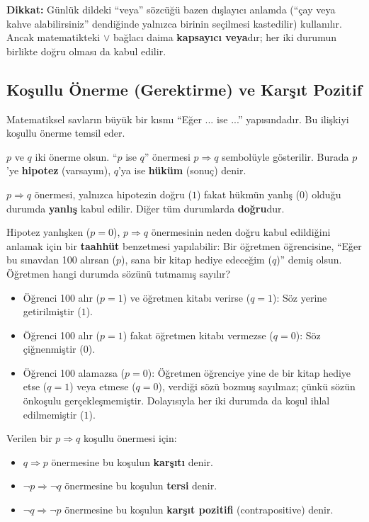 \textbf{Dikkat:} Günlük dildeki ``veya'' sözcüğü bazen dışlayıcı anlamda (``çay veya kahve alabilirsiniz'' dendiğinde yalnızca birinin seçilmesi kastedilir) kullanılır. Ancak matematikteki $\lor$ bağlacı daima \textbf{kapsayıcı veya}dır; her iki durumun birlikte doğru olması da kabul edilir.

\subsection{Koşullu Önerme (Gerektirme) ve Karşıt Pozitif}

Matematiksel savların büyük bir kısmı ``Eğer ... ise ...'' yapısındadır. Bu ilişkiyi koşullu önerme temsil eder.

\begin{definition}
$p$ ve $q$ iki önerme olsun. ``$p$ ise $q$'' önermesi $p \Rightarrow q$ sembolüyle gösterilir. Burada $p$'ye \textbf{hipotez} (varsayım), $q$'ya ise \textbf{hüküm} (sonuç) denir.

$p \Rightarrow q$ önermesi, yalnızca hipotezin doğru ($1$) fakat hükmün yanlış ($0$) olduğu durumda \textbf{yanlış} kabul edilir. Diğer tüm durumlarda \textbf{doğru}dur.
\end{definition}

Hipotez yanlışken ($p = 0$), $p \Rightarrow q$ önermesinin neden doğru kabul edildiğini anlamak için bir \textbf{taahhüt} benzetmesi yapılabilir: Bir öğretmen öğrencisine, ``Eğer bu sınavdan 100 alırsan ($p$), sana bir kitap hediye edeceğim ($q$)'' demiş olsun. Öğretmen hangi durumda sözünü tutmamış sayılır?
\begin{itemize}
  \item Öğrenci 100 alır ($p = 1$) ve öğretmen kitabı verirse ($q = 1$): Söz yerine getirilmiştir ($1$).
  \item Öğrenci 100 alır ($p = 1$) fakat öğretmen kitabı vermezse ($q = 0$): Söz çiğnenmiştir ($0$).
  \item Öğrenci 100 alamazsa ($p = 0$): Öğretmen öğrenciye yine de bir kitap hediye etse ($q = 1$) veya etmese ($q = 0$), verdiği sözü bozmuş sayılmaz; çünkü sözün önkoşulu gerçekleşmemiştir. Dolayısıyla her iki durumda da koşul ihlal edilmemiştir ($1$).
\end{itemize}

\begin{definition}
Verilen bir $p \Rightarrow q$ koşullu önermesi için:
\begin{itemize}
  \item $q \Rightarrow p$ önermesine bu koşulun \textbf{karşıtı} denir.
  \item $\neg p \Rightarrow \neg q$ önermesine bu koşulun \textbf{tersi} denir.
  \item $\neg q \Rightarrow \neg p$ önermesine bu koşulun \textbf{karşıt pozitifi} (contrapositive) denir.
\end{itemize}
\end{definition}

